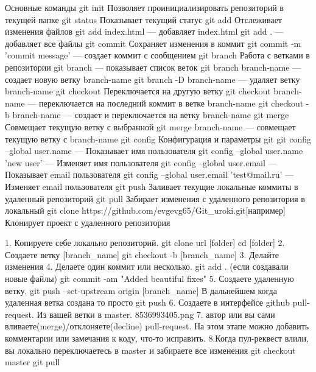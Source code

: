 
Основные команды
git init
Позволяет проинициализировать репозиторий в текущей папке
git status
Показывает текущий статус
git add
Отслеживает изменения файлов
git add index.html — добавляет index.html
git add . — добавляет все файлы
git commit
Сохраняет изменения в коммит
git commit -m 'commit message' — создает коммит с сообщением
git branch
Работа с ветками в репозитории
git branch — показывает список веток
git branch branch-name — создает новую ветку branch-name
git branch -D branch-name — удаляет ветку branch-name
git checkout
Переключается на другую ветку
git checkout branch-name — переключается на последний коммит в ветке
branch-name
git checkout -b branch-name — создает и переключается на ветку branch-name
git merge
Совмещает текущую ветку с выбранной
git merge branch-name — совмещает текущую ветку с branch-name
git config
Конфигурация и параметры git
git config --global user.name — Показывает имя пользователя
git config --global user.name 'new user' — Изменяет имя пользователя
git config --global user.email — Показывает email пользователя
git config --global user.email 'test@mail.ru' — Изменяет email пользователя
git push
Заливает текущие локальные коммиты в удаленный репозиторий
git pull
Забирает изменения с удаленного репозитория в локальный
git clone https://github.com/evgevg65/Git_uroki.git[например]
Клонирует проект с удаленного репозитория




1. Копируете себе локально репозиторий.
git clone url [folder]
cd [folder]
2. Создаете ветку [branch_name]
git checkout -b [branch_name]
3. Делайте изменения
4. Делаете один коммит или несколько.
git add . (если создавали новые файлы)
git commit -am "Added beautiful fixes"
5. Создаете удаленную ветку.
git push --set-upstream origin [branch_name]
В дальнейшем когда удаленная ветка создана то просто
git push
6. Создаете в интерфейсе github pull-request. Из вашей ветки в master.
8536993405.png
7. автор или вы сами вливаете(merge)/отклоняете(decline) pull-request.
На этом этапе можно добавить комментарии или замечания к коду, что-то исправить.
8.Когда пул-реквест влили, вы локально переключаетесь в master и забираете все изменения
git checkout master
git pull
